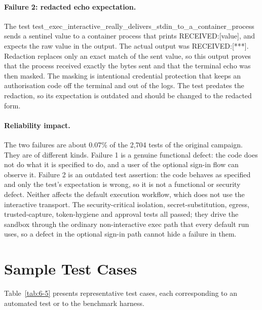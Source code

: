 \documentclass[12pt,a4paper,oneside]{report}
\begin{document}
\paragraph{Failure 2: redacted echo expectation.} The test test\_\allowbreak{}exec\_\allowbreak{}interactive\_\allowbreak{}really\_\allowbreak{}delivers\_\allowbreak{}stdin\_\allowbreak{}to\_\allowbreak{}a\_\allowbreak{}container\_\allowbreak{}process sends a sentinel value to a container process that prints RECEIVED:[value], and expects the raw value in the output. The actual output was RECEIVED:[***]. Redaction replaces only an exact match of the sent value, so this output proves that the process received exactly the bytes sent and that the terminal echo was then masked. The masking is intentional credential protection that keeps an authorisation code off the terminal and out of the logs. The test predates the redaction, so its expectation is outdated and should be changed to the redacted form.

\paragraph{Reliability impact.} The two failures are about 0.07\% of the 2,704 tests of the original campaign. They are of different kinds. Failure 1 is a genuine functional defect: the code does not do what it is specified to do, and a user of the optional sign-in flow can observe it. Failure 2 is an outdated test assertion: the code behaves as specified and only the test's expectation is wrong, so it is not a functional or security defect. Neither affects the default execution workflow, which does not use the interactive transport. The security-critical isolation, secret-substitution, egress, trusted-capture, token-hygiene and approval tests all passed; they drive the sandbox through the ordinary non-interactive exec path that every default run uses, so a defect in the optional sign-in path cannot hide a failure in them.

\section{Sample Test Cases}\label{sample-test-cases}

Table~\ref{tab:6-5} presents representative test cases, each corresponding to an automated test or to the benchmark harness.

\begingroup\small
\end{document}

